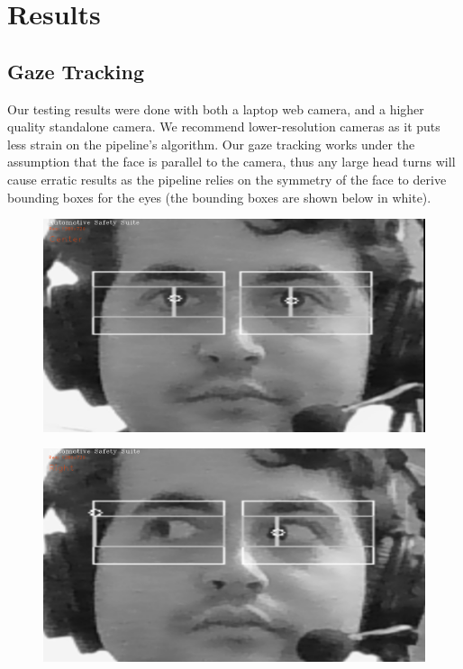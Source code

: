 \section{Results}

\subsection{Gaze Tracking}
Our testing results were done with both a laptop web camera, and a higher quality standalone camera. We recommend lower-resolution cameras as it puts less strain on the pipeline's algorithm. Our gaze tracking works under the assumption that the face is parallel to the camera, thus any large head turns will cause erratic results as the pipeline relies on the symmetry of the face to derive bounding boxes for the eyes (the bounding boxes are shown below in white). 

\begin{figure}[H]
    \centering
    \begin{minipage}{.45\textwidth}
      \centering
      \includegraphics[width=\linewidth]{figures/EyeTrackingStraight.png}
      \label{fig:eyeCtr}
    \end{minipage}%
    \hspace{15pt}
    \begin{minipage}{.45\textwidth}
      \centering
      \includegraphics[width=\linewidth]{figures/EyeTrackingRight.png}
      \label{fig:eyeRigt}
    \end{minipage}
\end{figure}


